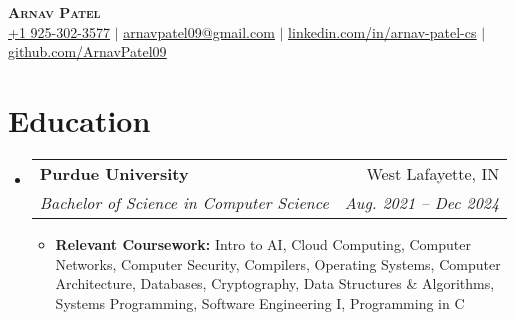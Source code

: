 \documentclass[letterpaper,11pt]{article}
\makeatletter
\newcommand{\resumeItem}[1]{
  \item\small{
    {#1 \vspace{-2pt}}
  }
}
\newcommand{\resumeSubheading}[4]{
  \vspace{-2pt}\item
    \begin{tabular*}{0.97\textwidth}[t]{l@{\extracolsep{\fill}}r}
      \textbf{#1} & #2 \\
      \textit{\small#3} & \textit{\small #4} \\
    \end{tabular*}\vspace{-7pt}
}
\newcommand{\resumeSubHeadingListStart}{\begin{itemize}[leftmargin=0.15in, label={}]}
\newcommand{\resumeSubHeadingListEnd}{\end{itemize}}
\newcommand{\resumeItemListStart}{\begin{itemize}}
\newcommand{\resumeItemListEnd}{\end{itemize}\vspace{-5pt}}
\makeatother
\begin{document}

\begin{center}
    \textbf{\Huge \scshape Arnav Patel} \\ \vspace{1pt}
    \small \href{tel:19253023577}{\underline{+1 925-302-3577}} $|$
    \href{mailto:arnavpatel09@gmail.com}{\underline{arnavpatel09@gmail.com}} $|$ 
    \href{https://www.linkedin.com/in/arnav-patel-cs}{\underline{linkedin.com/in/arnav-patel-cs}} $|$ \href{https://github.com/ArnavPatel09}{\underline{github.com/ArnavPatel09}}
\end{center}

\section{Education}
  \resumeSubHeadingListStart
    \resumeSubheading
      {Purdue University}{West Lafayette, IN}
      {Bachelor of Science in Computer Science}{Aug. 2021 -- Dec 2024}
      \resumeItemListStart
          \resumeItem{
            \textbf{Relevant Coursework:}
            Intro to AI, Cloud Computing, Computer Networks, Computer Security, Compilers, Operating Systems, Computer Architecture, Databases, Cryptography, Data Structures \& Algorithms, Systems Programming, Software Engineering I, Programming in C
          }
      \resumeItemListEnd
  \resumeSubHeadingListEnd
\end{document}
